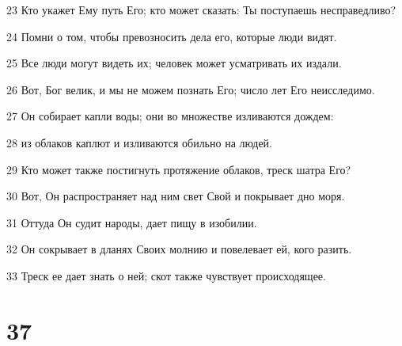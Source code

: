 \par 23 Кто укажет Ему путь Его; кто может сказать: Ты поступаешь несправедливо?
\par 24 Помни о том, чтобы превозносить дела его, которые люди видят.
\par 25 Все люди могут видеть их; человек может усматривать их издали.
\par 26 Вот, Бог велик, и мы не можем познать Его; число лет Его неисследимо.
\par 27 Он собирает капли воды; они во множестве изливаются дождем:
\par 28 из облаков каплют и изливаются обильно на людей.
\par 29 Кто может также постигнуть протяжение облаков, треск шатра Его?
\par 30 Вот, Он распространяет над ним свет Свой и покрывает дно моря.
\par 31 Оттуда Он судит народы, дает пищу в изобилии.
\par 32 Он сокрывает в дланях Своих молнию и повелевает ей, кого разить.
\par 33 Треск ее дает знать о ней; скот также чувствует происходящее.

\chapter{37}

